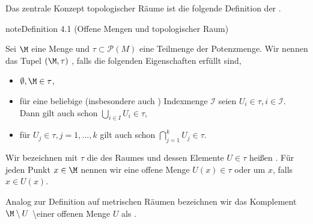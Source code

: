 \documentclass[letterpaper,10pt,german]{jupyterBook}
\begin{document}
\sphinxAtStartPar
Das zentrale Konzept topologischer Räume ist die folgende Definition der .
\label{manifolds/manifolds_prelim:definition-0}
\begin{sphinxadmonition}{note}{Definition 4.1 (Offene Mengen und topologischer Raum)}



\sphinxAtStartPar
Sei \(\M\) eine Menge und \(\tau \subset \mathcal{P}(M)\) eine Teilmenge der Potenzmenge.
Wir nennen das Tupel \((\M,\tau)\) , falls die folgenden Eigenschaften erfüllt sind,
\begin{itemize}
\item {} 
\sphinxAtStartPar
\(\emptyset, \M \in \tau\),

\item {} 
\sphinxAtStartPar
für eine beliebige (insbesondere auch ) Indexmenge \(\mathcal{I}\) seien \(U_i\in\tau, i\in \mathcal{I}\). Dann gilt auch schon \(\bigcup_{i\in I} U_i \in \tau\),

\item {} 
\sphinxAtStartPar
für  \(U_j\in\tau, j=1,\ldots, k\) gilt auch schon \(\bigcap_{j=1}^k U_j \in \tau\).

\end{itemize}

\sphinxAtStartPar
Wir bezeichnen mit \(\tau\) die  des Raumes und dessen Elemente \(U\in\tau\) heißen .
Für jeden Punkt \(x\in \M\) nennen wir eine offene Menge \(U(x) \in \tau\)  oder  um \(x\), falls \(x\in U(x)\).

\sphinxAtStartPar
Analog zur Definition auf metrischen Räumen bezeichnen wir das Komplement \(\M \setminus U\) \textbackslash{}einer offenen Menge \(U\) als .
\end{sphinxadmonition}
\end{document}
